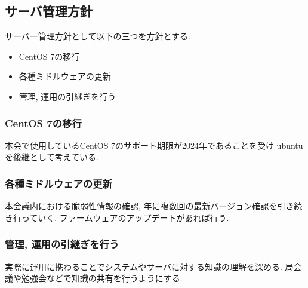 \subsection*{サーバ管理方針}


サーバー管理方針として以下の三つを方針とする.
\begin{itemize}
    \item CentOS 7の移行
    \item 各種ミドルウェアの更新
    \item 管理, 運用の引継ぎを行う
\end{itemize}

\subsubsection*{CentOS 7の移行}
本会で使用しているCentOS 7のサポート期限が2024年であることを受け
ubuntuを後継として考えている.


\subsubsection*{各種ミドルウェアの更新}
本会議内における脆弱性情報の確認,
年に複数回の最新バージョン確認を引き続き行っていく.
ファームウェアのアップデートがあれば行う.


\subsubsection*{管理, 運用の引継ぎを行う}
実際に運用に携わることでシステムやサーバに対する知識の理解を深める.
局会議や勉強会などで知識の共有を行うようにする.
